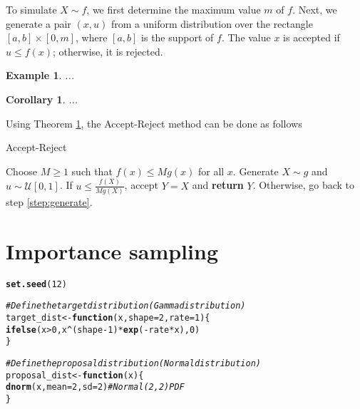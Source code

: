 \documentclass{article}\usepackage[]{graphicx}\usepackage[]{xcolor}
\makeatletter
\newcommand{\hlnum}[1]{\textcolor[rgb]{0.686,0.059,0.569}{#1}}%
\newcommand{\hlcom}[1]{\textcolor[rgb]{0.678,0.584,0.686}{\textit{#1}}}%
\newcommand{\hlopt}[1]{\textcolor[rgb]{0,0,0}{#1}}%
\newcommand{\hldef}[1]{\textcolor[rgb]{0.345,0.345,0.345}{#1}}%
\newcommand{\hlkwa}[1]{\textcolor[rgb]{0.161,0.373,0.58}{\textbf{#1}}}%
\newcommand{\hlkwb}[1]{\textcolor[rgb]{0.69,0.353,0.396}{#1}}%
\newcommand{\hlkwc}[1]{\textcolor[rgb]{0.333,0.667,0.333}{#1}}%
\newcommand{\hlkwd}[1]{\textcolor[rgb]{0.737,0.353,0.396}{\textbf{#1}}}%
\newenvironment{kframe}{%
 \def\at@end@of@kframe{}%
 \ifinner\ifhmode%
  \def\at@end@of@kframe{\end{minipage}}%
  \begin{minipage}{\columnwidth}%
 \fi\fi%
 \def\FrameCommand##1{\hskip\@totalleftmargin \hskip-\fboxsep
 \colorbox{shadecolor}{##1}\hskip-\fboxsep
     \hskip-\linewidth \hskip-\@totalleftmargin \hskip\columnwidth}%
 \MakeFramed {\advance\hsize-\width
   \@totalleftmargin\z@ \linewidth\hsize
   \@setminipage}}%
 {\par\unskip\endMakeFramed%
 \at@end@of@kframe}
\newenvironment{knitrout}{}{} %
\newtheorem{example}{Example}
\newtheorem{corollary}{Corollary}
\makeatother
\begin{document}
To simulate $X \sim f$, we first determine the maximum value $m$ of $f$. Next, we generate a pair $(x, u)$ from a uniform distribution over the rectangle $[a, b] \times [0, m]$, where $[a,b]$ is the support of $f$. The value $x$ is accepted if $u \leq f(x)$; otherwise, it is rejected.


\begin{example}
...
\end{example}

\begin{corollary}\label{Accept-Reject theorem}
...
\end{corollary}

Using Theorem \ref{Accept-Reject theorem}, the Accept-Reject method can be done as follows

\begin{algorithm}[H]
\caption{Accept-Reject}
\label{alg:accept-reject}
\begin{algorithmic}[1]
\State Choose \( M \geq 1 \) such that \( f(x) \leq M g(x) \) for all \( x \).
\State \label{step:generate} Generate \( X \sim g \) and \( u \sim \mathcal{U}[0,1] \).
\State If \( u \leq \frac{f(X)}{M g(X)} \), accept \( Y = X \) and \textbf{return} \( Y \).
\State Otherwise, go back to step \ref{step:generate}.
\end{algorithmic}
\end{algorithm}

\newpage
\section{Importance sampling}

\begin{knitrout}
\color{fgcolor}\begin{kframe}
\begin{alltt}
\hlkwd{set.seed}\hldef{(}\hlnum{12}\hldef{)}

\hlcom{# Define the target distribution (Gamma distribution)}
\hldef{target_dist} \hlkwb{<-} \hlkwa{function}\hldef{(}\hlkwc{x}\hldef{,} \hlkwc{shape} \hldef{=} \hlnum{2}\hldef{,} \hlkwc{rate} \hldef{=} \hlnum{1}\hldef{) \{}
  \hlkwd{ifelse}\hldef{(x} \hlopt{>} \hlnum{0}\hldef{, x}\hlopt{^}\hldef{(shape} \hlopt{-} \hlnum{1}\hldef{)} \hlopt{*} \hlkwd{exp}\hldef{(}\hlopt{-}\hldef{rate} \hlopt{*} \hldef{x),} \hlnum{0}\hldef{)}
\hldef{\}}

\hlcom{# Define the proposal distribution (Normal distribution)}
\hldef{proposal_dist} \hlkwb{<-} \hlkwa{function}\hldef{(}\hlkwc{x}\hldef{) \{}
  \hlkwd{dnorm}\hldef{(x,} \hlkwc{mean} \hldef{=} \hlnum{2}\hldef{,} \hlkwc{sd} \hldef{=} \hlnum{2}\hldef{)}  \hlcom{# Normal(2, 2) PDF}
\hldef{\}}
\end{alltt}
\end{kframe}
\end{knitrout}
\end{document}
